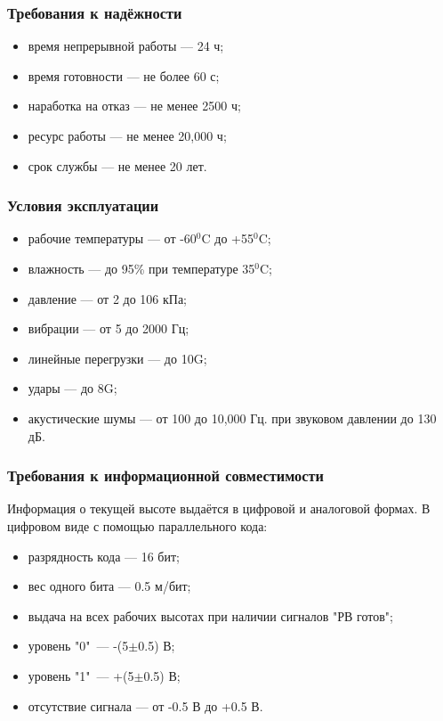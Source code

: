 \documentclass[utf8x, 14pt, oneside, a4paper]{article}
\begin{document}
			
			
			\subsubsection*{Требования к надёжности}
			\begin{itemize}
				\item время непрерывной работы --- 24 ч;
				\item время готовности --- не более 60 с;
				\item наработка на отказ --- не менее 2500 ч;
				\item ресурс работы --- не менее 20,000 ч;
				\item срок службы --- не менее 20 лет.
			\end{itemize}
			
			\subsubsection*{Условия эксплуатации}
			\begin{itemize}
				\item рабочие температуры --- от -60$^0$C до +55$^0$C;
				\item влажность --- до 95\% при температуре 35$^0$C;
				\item давление --- от 2 до 106 кПа;
				\item вибрации --- от 5 до 2000 Гц;
				\item линейные перегрузки --- до 10G;
				\item удары --- до 8G;
				\item акустические шумы --- от 100 до 10,000 Гц. при звуковом давлении до 130 дБ.
			\end{itemize}
			
			\subsubsection*{Требования к информационной совместимости}
			Информация о текущей высоте выдаётся в цифровой и аналоговой формах. В цифровом виде с помощью параллельного кода:
			\begin{itemize}
				\item разрядность кода --- 16 бит;
				\item вес одного бита --- 0.5 м/бит;
				\item выдача на всех рабочих высотах при наличии сигналов "РВ готов";
				\item уровень "0"\ --- -(5$\pm$0.5) В;
				\item уровень "1"\ --- +(5$\pm$0.5) В;
				\item отсутствие сигнала --- от -0.5 В до +0.5 В.
			\end{itemize}
			
\end{document}
